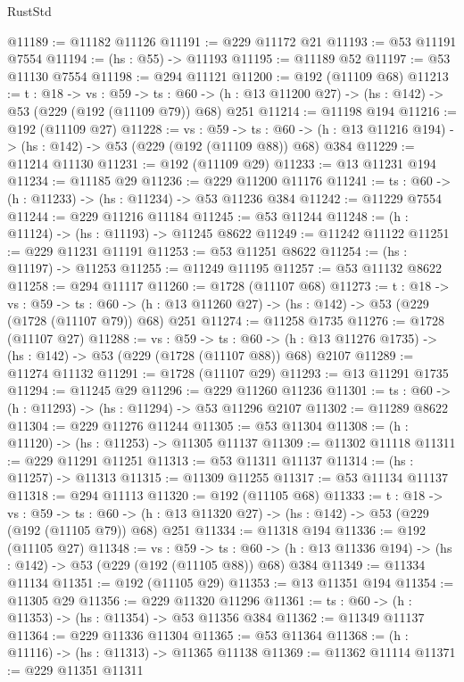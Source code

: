 \begin{lexlean}{RustStd}
\begin{coremodule}
@11189 := @11182 @11126
@11191 := @229 @11172 @21
@11193 := @53 @11191 @7554
@11194 := (hs : @55) -> @11193
@11195 := @11189 @52
@11197 := @53 @11130 @7554
@11198 := @294 @11121
@11200 := @192 (@11109 @68)
@11213 := {t : @18} ->
  {vs : @59} ->
  {ts : @60} -> (h : @13 @11200 @27) -> (hs : @142) -> @53 (@229 (@192 (@11109 @79)) @68) @251
@11214 := @11198 @194
@11216 := @192 (@11109 @27)
@11228 := {vs : @59} ->
  {ts : @60} -> (h : @13 @11216 @194) -> (hs : @142) -> @53 (@229 (@192 (@11109 @88)) @68) @384
@11229 := @11214 @11130
@11231 := @192 (@11109 @29)
@11233 := @13 @11231 @194
@11234 := @11185 @29
@11236 := @229 @11200 @11176
@11241 := {ts : @60} -> (h : @11233) -> (hs : @11234) -> @53 @11236 @384
@11242 := @11229 @7554
@11244 := @229 @11216 @11184
@11245 := @53 @11244
@11248 := (h : @11124) -> (hs : @11193) -> @11245 @8622
@11249 := @11242 @11122
@11251 := @229 @11231 @11191
@11253 := @53 @11251 @8622
@11254 := (hs : @11197) -> @11253
@11255 := @11249 @11195
@11257 := @53 @11132 @8622
@11258 := @294 @11117
@11260 := @1728 (@11107 @68)
@11273 := {t : @18} ->
  {vs : @59} ->
  {ts : @60} -> (h : @13 @11260 @27) -> (hs : @142) -> @53 (@229 (@1728 (@11107 @79)) @68) @251
@11274 := @11258 @1735
@11276 := @1728 (@11107 @27)
@11288 := {vs : @59} ->
  {ts : @60} -> (h : @13 @11276 @1735) -> (hs : @142) -> @53 (@229 (@1728 (@11107 @88)) @68) @2107
@11289 := @11274 @11132
@11291 := @1728 (@11107 @29)
@11293 := @13 @11291 @1735
@11294 := @11245 @29
@11296 := @229 @11260 @11236
@11301 := {ts : @60} -> (h : @11293) -> (hs : @11294) -> @53 @11296 @2107
@11302 := @11289 @8622
@11304 := @229 @11276 @11244
@11305 := @53 @11304
@11308 := (h : @11120) -> (hs : @11253) -> @11305 @11137
@11309 := @11302 @11118
@11311 := @229 @11291 @11251
@11313 := @53 @11311 @11137
@11314 := (hs : @11257) -> @11313
@11315 := @11309 @11255
@11317 := @53 @11134 @11137
@11318 := @294 @11113
@11320 := @192 (@11105 @68)
@11333 := {t : @18} ->
  {vs : @59} ->
  {ts : @60} -> (h : @13 @11320 @27) -> (hs : @142) -> @53 (@229 (@192 (@11105 @79)) @68) @251
@11334 := @11318 @194
@11336 := @192 (@11105 @27)
@11348 := {vs : @59} ->
  {ts : @60} -> (h : @13 @11336 @194) -> (hs : @142) -> @53 (@229 (@192 (@11105 @88)) @68) @384
@11349 := @11334 @11134
@11351 := @192 (@11105 @29)
@11353 := @13 @11351 @194
@11354 := @11305 @29
@11356 := @229 @11320 @11296
@11361 := {ts : @60} -> (h : @11353) -> (hs : @11354) -> @53 @11356 @384
@11362 := @11349 @11137
@11364 := @229 @11336 @11304
@11365 := @53 @11364
@11368 := (h : @11116) -> (hs : @11313) -> @11365 @11138
@11369 := @11362 @11114
@11371 := @229 @11351 @11311

\end{coremodule}
\end{lexlean}
